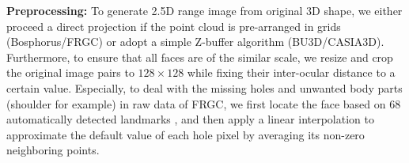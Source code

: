 \documentclass{bmvc2k}
\begin{document}




\textbf{Preprocessing:} To generate 2.5D range image from original 3D shape, we either proceed a direct projection if the point cloud is pre-arranged in grids (Bosphorus/FRGC) or adopt a simple Z-buffer algorithm (BU3D/CASIA3D). Furthermore, to ensure that all faces are of the similar scale, we resize and crop the original image pairs to $128\times128$ while fixing their inter-ocular distance to a certain value. Especially, to deal with the missing holes and unwanted body parts (shoulder for example) in raw data of FRGC, we first locate the face based on 68 automatically detected landmarks \cite{asthana2014incremental}, and then apply a linear interpolation to approximate the default value of each hole pixel by averaging its non-zero neighboring points. %

\end{document}

